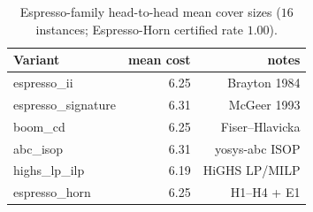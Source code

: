 \begin{table}[t]
\centering
\caption{Espresso-family head-to-head mean cover sizes ($16$ instances; Espresso-Horn certified rate $1.00$).}
\label{tab:espresso-horn}
\begin{tabular}{lrr}
\hline
Variant & mean cost & notes \\
\hline
espresso\_ii & 6.25 & Brayton 1984 \\
espresso\_signature & 6.31 & McGeer 1993 \\
boom\_cd & 6.25 & Fiser--Hlavicka \\
abc\_isop & 6.31 & yosys-abc ISOP \\
highs\_lp\_ilp & 6.19 & HiGHS LP/MILP \\
espresso\_horn & 6.25 & H1--H4 + E1 \\
\hline
\end{tabular}
\end{table}
